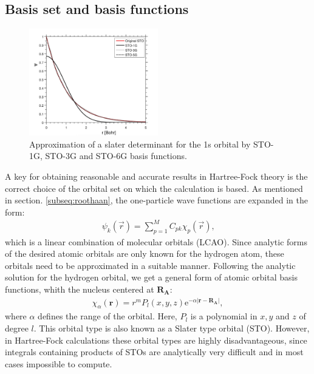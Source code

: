 \documentclass[twoside,        %
			   11pt,			%
               BCOR10mm,       %
               ngerman,english  %
               ]{scrartcl}
\begin{document}
\subsection{Basis set and basis functions}\label{subsec:Basis}
\begin{figure}[h!]
\centering
\includegraphics[width=0.5\textwidth]{figures/1228px-Gauss_sto4.png}
\caption{Approximation of a slater determinant for the 1s orbital by STO-1G, STO-3G and STO-6G basis functions. \cite{pict}}
\label{fig:STO_GTO}
\end{figure}

A key for obtaining reasonable and accurate results in Hartree-Fock theory is the correct choice of the orbital set on which the calculation is based. As mentioned in section. \ref{subseq:roothaan}, the one-particle wave functions are expanded in the form:
\begin{align*}
    \psi_k(\vec{r}) = \sum_{p=1}^M C_{pk} \chi_p (\vec{r})\text{,}
\end{align*} which is a linear combination of molecular orbitals (LCAO).
Since analytic forms of the desired atomic orbitals are only known for the hydrogen atom, these orbitals need to be approximated in a suitable manner. Following the analytic solution for the hydrogen orbital, we get a general form of atomic orbital basis functions, whith the nucleus centered at $\mathbf{R_\text{A}}$:
\begin{align*}
\chi_\alpha (\mathbf{r}) = r^m P_l (x,y,z) \text{e}^{-\alpha |\mathbf{r-R_\text{A}}|},
\end{align*}
where $\alpha$ defines the range of the orbital. Here, $P_l$ is a polynomial in $x,y$ and $z$ of degree $l$. This orbital type is also known as a Slater type orbital (STO). However, in Hartree-Fock calculations these orbital types are highly disadvantageous, since integrals containing products of STOs are analytically very difficult and in most cases impossible to compute.
\end{document}
